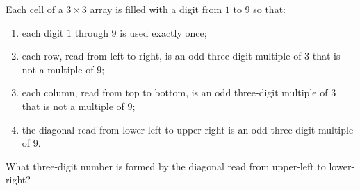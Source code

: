 Each cell of a $3\times3$ array is filled with a digit from $1$ to $9$ so that:
\begin{enumerate}
\item each digit $1$ through $9$ is used exactly once;
\item each row, read from left to right, is an odd three-digit multiple of $3$ that is not a multiple of $9$;
\item each column, read from top to bottom, is an odd three-digit multiple of $3$ that is not a multiple of $9$;
\item the diagonal read from lower-left to upper-right is an odd three-digit multiple of $9$.
\end{enumerate}
What three-digit number is formed by the diagonal read from upper-left to lower-right?
